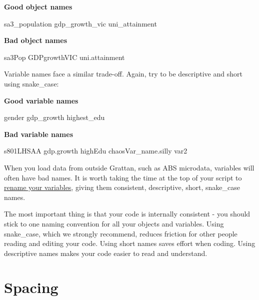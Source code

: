 \documentclass[]{book}
\newenvironment{Shaded}{\begin{snugshade}}{\end{snugshade}}
\newcommand{\NormalTok}[1]{#1}
\begin{document}
\textbf{Good object names}

\begin{Shaded}
\begin{Highlighting}[]
\NormalTok{sa3_population}
\NormalTok{gdp_growth_vic}
\NormalTok{uni_attainment}
\end{Highlighting}
\end{Shaded}

\textbf{Bad object names}

\begin{Shaded}
\begin{Highlighting}[]
\NormalTok{sa3Pop}
\NormalTok{GDPgrowthVIC}
\NormalTok{uni.attainment}
\end{Highlighting}
\end{Shaded}

Variable names face a similar trade-off. Again, try to be descriptive and short using snake\_case:

\textbf{Good variable names}

\begin{Shaded}
\begin{Highlighting}[]
\NormalTok{gender}
\NormalTok{gdp_growth}
\NormalTok{highest_edu}
\end{Highlighting}
\end{Shaded}

\textbf{Bad variable names}

\begin{Shaded}
\begin{Highlighting}[]
\NormalTok{s801LHSAA}
\NormalTok{gdp.growth}
\NormalTok{highEdu}
\NormalTok{chaosVar_name.silly}
\NormalTok{var2}
\end{Highlighting}
\end{Shaded}

When you load data from outside Grattan, such as ABS microdata, variables will often have bad names. It is worth taking the time at the top of your script to \href{https://dplyr.tidyverse.org/reference/select.html}{rename your variables}, giving them consistent, descriptive, short, snake\_case names.

The most important thing is that your code is internally consistent - you should stick to one naming convention for all your objects and variables. Using snake\_case, which we strongly recommend, reduces friction for other people reading and editing your code. Using short names saves effort when coding. Using descriptive names makes your code easier to read and understand.

\hypertarget{spacing}{%
\section{Spacing}\label{spacing}}
\end{document}
